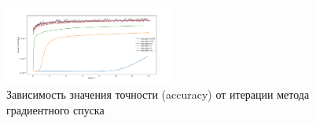 \documentclass[a4paper, 11pt]{article}
\begin{document}
\begin{figure}[H]
\begin{multicols}{2}
\begin{center}
                            \caption{Зависимость значения точности (accuracy) от итерации метода градиентного спуска} \label{exp2:gd_acc_iter}
                            \includegraphics[width=0.5\textwidth, height=0.25\textheight]{../graphs/exp1_accuracy_GD_alpha_time_beta=0,001.pdf}
                        \end{center}
                    \end{multicols}
                \end{figure}
            
\end{document}
